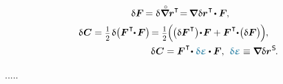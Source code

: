 \begin{equation}
\begin{array}{c}
\:\,
\variation{\bm{F}} \hspace{-0.2ex} = \variation{\hspace{.1ex} \boldnablacircled \currentlocationvector^{\T}} \hspace{-0.4ex}
= \hspace{-0.2ex} \boldnabla \hspace{.1ex} \variation{\currentlocationvector}^{\hspace{.1ex}\T} \hspace{-0.25ex} \dotp \bm{F}
\hspace{-0.1ex} ,
\\[.5em]
%
\begin{multlined}
\variation{\hspace{.1ex}\bm{C}}
= \smalldisplaystyleonehalf \hspace{.2ex} \variation{ \bigl( \bm{F}^{\hspace{.1ex}\T} \hspace{-0.6ex} \dotp \hspace{-0.2ex} \bm{F} \bigr) } \hspace{-0.25ex}
= \smalldisplaystyleonehalf \hspace{-0.1ex} \Bigl( \hspace{-0.1ex}
     \bigl( \variation{\bm{F}^{\hspace{.1ex}\T}} \bigr) \hspace{-0.4ex} \dotp \hspace{-0.3ex} \bm{F}
     + \bm{F}^{\hspace{.1ex}\T} \hspace{-0.5ex} \dotp \hspace{-0.4ex} \bigl( \variation{\bm{F}} \bigr)
\hspace{-0.1ex} \Bigr) \hspace{-0.1ex} ,
\\[-1em]
%
\variation{\hspace{.1ex}\bm{C}}
= \bm{F}^{\hspace{.1ex}\T} \hspace{-0.4ex} \dotp \infinimentpetitedeformationvariation \dotp \bm{F} ,
\:\,
\infinimentpetitedeformationvariation \equiv \insideinfinitesimalstrainvariation
\hspace{.1ex} .
\end{multlined}
\end{array}
\end{equation}

.....

